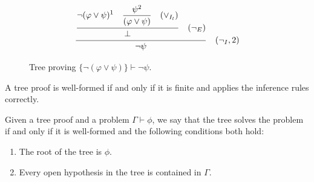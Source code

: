 \begin{figure}
    \centering
    \[
    \frac{\displaystyle \frac{
    \displaystyle \neg (\varphi \lor \psi)^1 \quad \displaystyle \frac{\psi^2}{(\varphi \lor \psi) \strut} \quad (\lor_{I_l}) \strut}
    {\displaystyle \bot \strut} \quad (\displaystyle \neg_E)\strut} {\displaystyle \neg \psi \strut} \quad (\neg_I, 2)
    \]
    \caption{Tree proving \( \{\neg (\varphi \lor \psi)\} \vdash \neg \psi \).}
    \label{tab:proof-tree}
\end{figure}


\begin{definition}
A tree proof is well-formed if and only if it is finite and applies the inference rules correctly.
\end{definition}

\begin{definition}
Given a tree proof and a problem \(\Gamma \vdash \phi\), we say that the tree solves the problem if and only if it is well-formed and the following conditions both hold:
\begin{enumerate}
    \item The root of the tree is \(\phi\).
    \item Every open hypothesis in the tree is contained in \(\Gamma\).
\end{enumerate}
\end{definition}